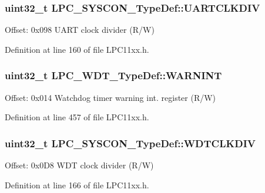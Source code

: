 \subsubsection[{\texorpdfstring{U\+A\+R\+T\+C\+L\+K\+D\+IV}{UARTCLKDIV}}]{ uint32\+\_\+t L\+P\+C\+\_\+\+S\+Y\+S\+C\+O\+N\+\_\+\+Type\+Def\+::\+U\+A\+R\+T\+C\+L\+K\+D\+IV}\hypertarget{group___l_p_c11xx___definitions_ga5246aff7a74ac569d5a25364601e3a62}{}\label{group___l_p_c11xx___definitions_ga5246aff7a74ac569d5a25364601e3a62}
Offset\+: 0x098 U\+A\+RT clock divider (R/W) 

Definition at line 160 of file L\+P\+C11xx.\+h.

\subsubsection[{\texorpdfstring{W\+A\+R\+N\+I\+NT}{WARNINT}}]{ uint32\+\_\+t L\+P\+C\+\_\+\+W\+D\+T\+\_\+\+Type\+Def\+::\+W\+A\+R\+N\+I\+NT}\hypertarget{group___l_p_c11xx___definitions_gab3fd0a78f0582b2905bb674a562fdd9d}{}\label{group___l_p_c11xx___definitions_gab3fd0a78f0582b2905bb674a562fdd9d}
Offset\+: 0x014 Watchdog timer warning int. register (R/W) 

Definition at line 457 of file L\+P\+C11xx.\+h.

\subsubsection[{\texorpdfstring{W\+D\+T\+C\+L\+K\+D\+IV}{WDTCLKDIV}}]{ uint32\+\_\+t L\+P\+C\+\_\+\+S\+Y\+S\+C\+O\+N\+\_\+\+Type\+Def\+::\+W\+D\+T\+C\+L\+K\+D\+IV}\hypertarget{group___l_p_c11xx___definitions_ga5d787d109526ad3eb0278790fb71a58b}{}\label{group___l_p_c11xx___definitions_ga5d787d109526ad3eb0278790fb71a58b}
Offset\+: 0x0\+D8 W\+DT clock divider (R/W) 

Definition at line 166 of file L\+P\+C11xx.\+h.

